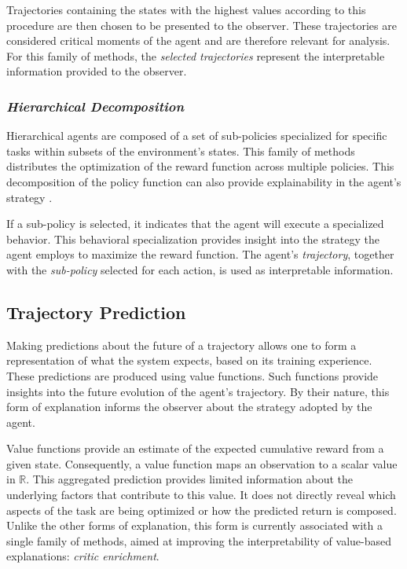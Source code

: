 Trajectories containing the states with the highest values according to this procedure are then chosen to be presented to the observer.
These trajectories are considered critical moments of the agent and are therefore relevant for analysis.
For this family of methods, the \textit{selected trajectories} represent the interpretable information provided to the observer.

\subsubsection{\textit{Hierarchical Decomposition}}
\label{subsubsec:hierarchical_decomposition}

Hierarchical agents are composed of a set of sub-policies specialized for specific tasks within subsets of the environment's states.
This family of methods distributes the optimization of the reward function across multiple policies.
This decomposition of the policy function can also provide explainability in the agent's strategy \parencite{Beyret_2019}.

If a sub-policy is selected, it indicates that the agent will execute a specialized behavior.
This behavioral specialization provides insight into the strategy the agent employs to maximize the reward function.
The agent's \textit{trajectory}, together with the \textit{sub-policy} selected for each action, is used as interpretable information.

\subsection{Trajectory Prediction}
\label{subsec:trajectory_prediction}

Making predictions about the future of a trajectory allows one to form a representation of what the system expects, based on its training experience.
These predictions are produced using value functions.
Such functions provide insights into the future evolution of the agent's trajectory.
By their nature, this form of explanation informs the observer about the strategy adopted by the agent.

Value functions provide an estimate of the expected cumulative reward from a given state.
Consequently, a value function maps an observation to a scalar value in $\mathbb{R}$.
This aggregated prediction provides limited information about the underlying factors that contribute to this value.
It does not directly reveal which aspects of the task are being optimized or how the predicted return is composed.
Unlike the other forms of explanation, this form is currently associated with a single family of methods, aimed at improving the interpretability of value-based explanations: \textit{critic enrichment}.

